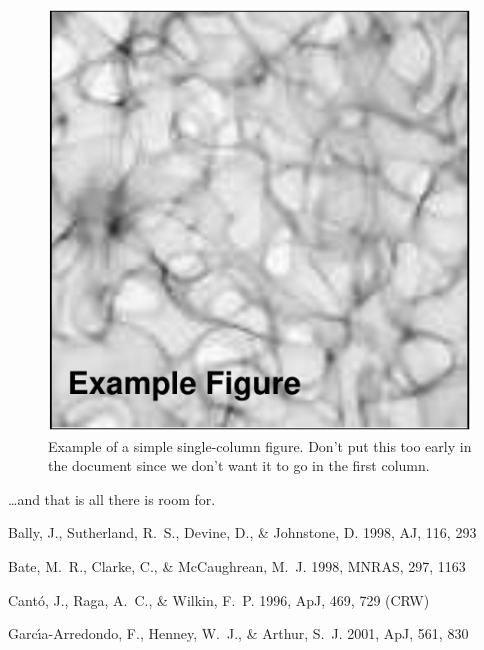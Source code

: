 \documentclass[preprint]{rmxac}
\begin{document}
\begin{figure}[!t]
  \includegraphics[width=\columnwidth]{example-fig}
  \caption{Example of a simple single-column figure. Don't put this
    too early in the document since we don't want it to go in the
    first column.}
  \label{fig:simple}
\end{figure}

\dots and that is all there is room for.

\begin{thebibliography}

 Bally, J., Sutherland, R.~S., Devine, D., \&
  Johnstone, D. 1998, AJ, 116, 293

 Bate, M.~R., Clarke, C., \& McCaughrean, M.~J. 1998,
  MNRAS, 297, 1163

 Cant\'o, J., Raga, A.~C., \& Wilkin, F.~P. 1996, ApJ,
  469, 729 (CRW)

 Garc\'\i a-Arredondo, F., Henney, W.~J., \& Arthur,
  S.~J. 2001, ApJ, 561, 830 
  
\end{thebibliography}
\end{document}
